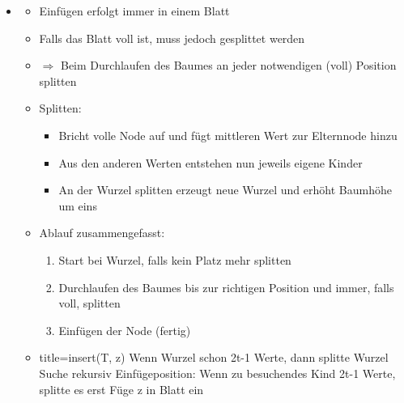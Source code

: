 \documentclass[
    12pt,
    a4paper,
    ngerman,
    color=3b,%
    marginpar=false,
    colorback=false,
    leqno,
]{tudaexercise}
\begin{document}
\begin{itemize}
        \item {}
            \begin{itemize}
                \item Einfügen erfolgt immer in einem Blatt
                \item Falls das Blatt voll ist, muss jedoch gesplittet werden
                \item $\Rightarrow$ Beim Durchlaufen des Baumes an jeder notwendigen (voll) Position splitten
                \item Splitten:
                    \begin{itemize}
                        \item Bricht volle Node auf und fügt mittleren Wert zur Elternnode hinzu
                        \item Aus den anderen Werten entstehen nun jeweils eigene Kinder
                        \item An der Wurzel splitten erzeugt neue Wurzel und erhöht Baumhöhe um eins
                    \end{itemize}
                \item Ablauf zusammengefasst:
                    \begin{enumerate}
                        \item Start bei Wurzel, falls kein Platz mehr splitten
                        \item Durchlaufen des Baumes bis zur richtigen Position und immer, falls voll, splitten
                        \item Einfügen der Node (fertig)
                    \end{enumerate}
                \item[]
                    \begin{ccode}[autogobble]{title={insert(T, z)}}
                    Wenn Wurzel schon 2t-1 Werte, dann splitte Wurzel
                    Suche rekursiv Einfügeposition:
                        Wenn zu besuchendes Kind 2t-1 Werte, splitte es erst
                    Füge z in Blatt ein
                    \end{ccode}
            \end{itemize}

\clearpage


\end{itemize}
\end{document}
